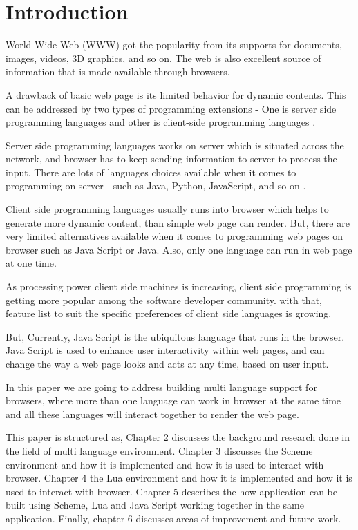 \chapter{Introduction}
World Wide Web (WWW) got the popularity from its supports for documents, images, videos, 3D graphics, and so on. The web is also excellent source of information that is made available through browsers.

A drawback of basic web page is its limited behavior for dynamic contents. This can be addressed by two types of programming extensions -  One is server side programming languages and other is client-side programming languages \cite{LoginWeb}.

Server side programming languages works on server which is situated across the network, and browser has to keep sending information to server to process the input. There are lots of languages choices available when it comes to programming on server - such as Java, Python, JavaScript, and so on \cite{LoginWeb}.

Client side programming languages usually runs into browser which helps to generate more dynamic content, than simple web page can render. But, there are very limited alternatives available when it comes to programming web pages on browser such as Java Script or Java. Also, only one language can run in web page at one time.

As processing power client side machines is increasing, client side programming is getting more popular among the software developer community. with that, feature list to suit the specific preferences of client side languages is growing. 

But, Currently, Java Script is the ubiquitous language that runs in the browser. Java Script is used to enhance user interactivity within web pages, and can change the way a web page looks and acts at any time, based on user input.

In this paper we are going to address building multi language support for browsers, where more than one language can work in browser at the same time and all these languages will interact together to render the web page. 


This paper is structured as, Chapter 2 discusses the background research done in the field of multi language environment. Chapter 3 discusses the Scheme environment and how it is implemented and how it is used to interact with browser. Chapter 4 the Lua environment and how it is implemented and how it is used to interact with browser. Chapter 5 describes the how application can be built using Scheme, Lua and Java Script working together in the same application. Finally, chapter 6 discusses areas of improvement and future work.


